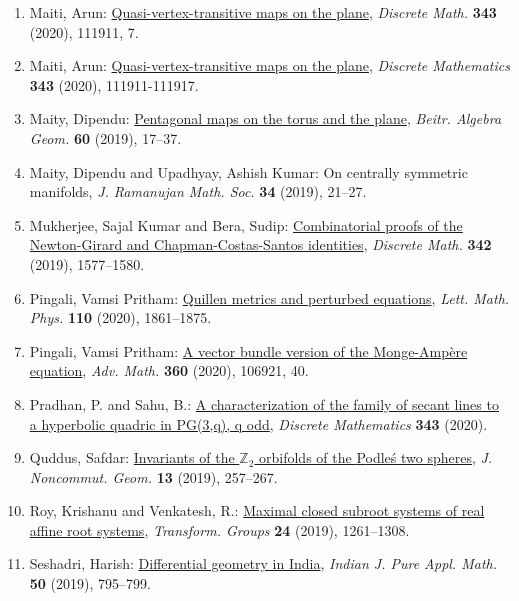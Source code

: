 \begin{enumerate}[resume, leftmargin=27pt]
	\item Maiti, Arun: \href{https://doi.org/10.1016/j.disc.2020.111911}{Quasi-vertex-transitive maps on the plane}, \emph{Discrete Math.} {\bf 343} (2020), 111911, 7.

	\item Maiti, Arun: \href{https://www.sciencedirect.com/science/article/pii/S0012365X20301035}{Quasi-vertex-transitive maps on the plane}, \emph{Discrete Mathematics} {\bf 343} (2020), 111911-111917.

	\item Maity, Dipendu: \href{https://doi.org/10.1007/s13366-018-0405-7}{Pentagonal maps on the torus and the plane}, \emph{Beitr. Algebra Geom.} {\bf 60} (2019), 17--37.
	\item Maity, Dipendu and Upadhyay, Ashish Kumar: On centrally symmetric manifolds, \emph{J. Ramanujan Math. Soc.} {\bf 34} (2019), 21--27.

	\item Mukherjee, Sajal Kumar and Bera, Sudip: \href{https://doi.org/10.1016/j.disc.2019.02.013}{Combinatorial proofs of the {N}ewton-{G}irard and
		      {C}hapman-{C}ostas-{S}antos identities}, \emph{Discrete Math.} {\bf 342} (2019), 1577--1580.

	\item Pingali, Vamsi Pritham: \href{https://doi.org/10.1007/s11005-020-01279-9}{Quillen metrics and perturbed equations}, \emph{Lett. Math. Phys.} {\bf 110} (2020), 1861--1875.

	\item Pingali, Vamsi Pritham: \href{https://doi.org/10.1016/j.aim.2019.106921}{A vector bundle version of the {M}onge-{A}mp\`ere equation}, \emph{Adv. Math.} {\bf 360} (2020), 106921, 40.

	\item Pradhan, P. and Sahu, B.: \href{https://doi.org/10.1016/j.disc.2020.112044}{A characterization of the family of secant lines to a hyperbolic quadric in PG(3,q), q odd}, \emph{Discrete Mathematics} {\bf 343} (2020).

	\item Quddus, Safdar: \href{https://doi.org/10.4171/JNCG/320}{Invariants of the {$\mathbb{Z}_2$} orbifolds of the {P}odle\'{s} two
	      spheres}, \emph{J. Noncommut. Geom.} {\bf 13} (2019), 257--267.

	\item Roy, Krishanu and Venkatesh, R.: \href{https://doi.org/10.1007/s00031-018-9510-9}{Maximal closed subroot systems of real affine root systems}, \emph{Transform. Groups} {\bf 24} (2019), 1261--1308.

	\item Seshadri, Harish: \href{https://doi.org/10.1007/s13226-019-0355-2}{Differential geometry in {I}ndia}, \emph{Indian J. Pure Appl. Math.} {\bf 50} (2019), 795--799.

\end{enumerate}
\vspace{0.5mm}


